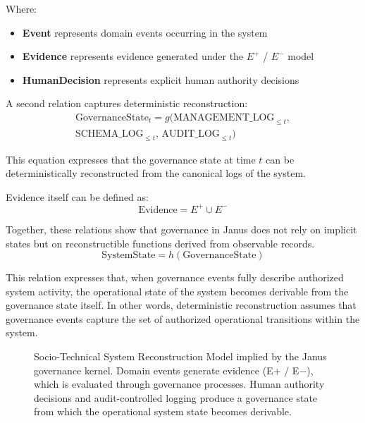 \documentclass[conference]{IEEEtran}
\begin{document}
Where:
\begin{itemize}
  \item \textbf{Event} represents domain events occurring in the system
  \item \textbf{Evidence} represents evidence generated under the $E^{+}$ / $E^{-}$ model
  \item \textbf{HumanDecision} represents explicit human authority decisions
\end{itemize}

A second relation captures deterministic reconstruction:
\begin{equation}
\begin{split}
\mathrm{GovernanceState}_{t} = g(\mathrm{MANAGEMENT\_LOG}_{\le t},\\
\mathrm{SCHEMA\_LOG}_{\le t},\, \mathrm{AUDIT\_LOG}_{\le t})
\end{split}
\end{equation}

This equation expresses that the governance state at time \textbf{$t$} can be deterministically reconstructed from the canonical logs of the system.

Evidence itself can be defined as:
\begin{equation}
\mathrm{Evidence} = E^{+} \cup E^{-}
\end{equation}

Together, these relations show that governance in Janus does not rely on implicit states but on reconstructible functions derived from observable records.
\begin{equation}
\mathrm{SystemState} = h(\mathrm{GovernanceState})
\end{equation}

This relation expresses that, when governance events fully describe authorized system activity, the operational state of the system becomes derivable from the governance state itself. In other words, deterministic reconstruction assumes that governance events capture the set of authorized operational transitions within the system.

\begin{figure}[ht]
\centering
{}
\caption{Socio-Technical System Reconstruction Model implied by the Janus governance kernel. Domain events generate evidence (E+ / E−), which is evaluated through governance processes. Human authority decisions and audit-controlled logging produce a governance state from which the operational system state becomes derivable.}
\label{fig:janus_reconstruction}
\end{figure}
\end{document}
